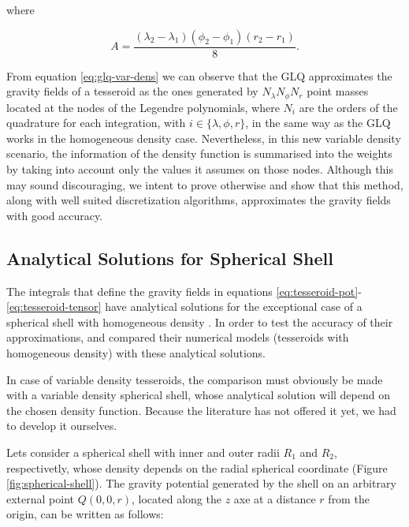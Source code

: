 \documentclass[extra]{gji}
\begin{document}
\noindent where

\begin{equation}
    A = 
    \frac{(\lambda_2 - \lambda_1)(\phi_2 - \phi_1)(r_2 - r_1)}{8}.
\end{equation}

From equation \ref{eq:glq-var-dens} we can observe that the GLQ approximates the gravity fields of a tesseroid as the ones generated by $N_\lambda N_\phi N_r$ point masses located at the nodes of the Legendre polynomials, where $N_i$ are the orders of the quadrature for each integration, with $i \in \{ \lambda, \phi, r \}$, in the same way as the GLQ works in the homogeneous density case.
Nevertheless, in this new variable density scenario, the information of the density function is summarised into the weights by taking into account only the values it assumes on those nodes.
Although this may sound discouraging, we intent to prove otherwise and show that this method, along with well suited discretization algorithms, approximates the gravity fields with good accuracy.


\subsection{Analytical Solutions for Spherical Shell}

The integrals that define the gravity fields in equations \ref{eq:tesseroid-pot}-\ref{eq:tesseroid-tensor} have analytical solutions for the exceptional case of a spherical shell with homogeneous density \citep{Mikuska2006,Grombein2013}.
In order to test the accuracy of their approximations, \citet{Uieda2016} and \citet{Grombein2013} compared their numerical models (tesseroids with homogeneous density) with these analytical solutions.

In case of variable density tesseroids, the comparison must obviously be made with a variable density spherical shell, whose analytical solution will depend on the chosen density function.
Because the literature has not offered it yet, we had to develop it ourselves. 

Lets consider a spherical shell with inner and outer radii $R_1$ and $R_2$, respectivetly, whose density depends on the radial spherical coordinate (Figure \ref{fig:spherical-shell}).
The gravity potential generated by the shell on an arbitrary external point $Q(0,0,r)$, located along the $z$ axe at a distance $r$ from the origin, can be written as follows:
\end{document}

